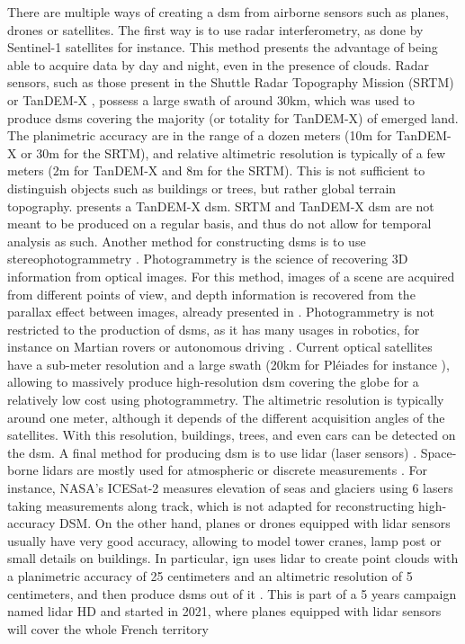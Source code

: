 There are multiple ways of creating a \acrshort{dsm} from airborne sensors such as planes, drones or satellites. The first way is to use \acrshort{radar} interferometry, as done by Sentinel-1 satellites \cite{geudtner_sentinel-1_2014} for instance. This method presents the advantage of being able to acquire data by day and night, even in the presence of clouds. Radar sensors, such as those present in the Shuttle Radar Topography Mission (SRTM) \cite{farr_shuttle_2007} or TanDEM-X \cite{krieger_tandem-x_2007}, possess a large swath of around $30$km, which was used to produce \acrshort{dsm}s covering the majority (or totality for TanDEM-X) of emerged land. The planimetric accuracy are in the range of a dozen meters (10m for TanDEM-X or 30m for the SRTM), and relative altimetric resolution is typically of a few meters (2m for TanDEM-X and 8m for the SRTM). This is not sufficient to distinguish objects such as buildings or trees, but rather global terrain topography.  presents a TanDEM-X \acrshort{dsm}. SRTM and TanDEM-X \acrshort{dsm} are not meant to be produced on a regular basis, and thus do not allow for temporal analysis as such. Another method for constructing \acrshort{dsm}s is to use stereophotogrammetry \cite{tao_comprehensive_2001}. Photogrammetry is the science of recovering 3D information from optical images. For this method, images of a scene are acquired from different points of view, and depth information is recovered from the parallax effect between images, already presented in . Photogrammetry is not restricted to the production of \acrshort{dsm}s, as it has many usages in robotics, for instance on Martian rovers \cite{goldberg_stereo_2002} or autonomous driving \cite{geiger_vision_2013}. Current optical satellites have a sub-meter resolution and a large swath (20km for Pléiades for instance \cite{coeurdevey_pleiades_2012}), allowing to massively produce high-resolution \acrshort{dsm} covering the globe for a relatively low cost using photogrammetry. The altimetric resolution is typically around one meter, although it depends of the different acquisition angles of the satellites. With this resolution, buildings, trees, and even cars can be detected on the \acrshort{dsm}. A final method for producing \acrshort{dsm} is to use \acrshort{lidar} (laser sensors) \cite{khosravipour_generating_2016}. Space-borne \acrshort{lidar}s are mostly used for atmospheric or discrete measurements \cite{fouladinejad_history_2019}. For instance, NASA’s ICESat-2 \cite{jasinski_atlasicesat-2_2020} measures elevation of seas and glaciers using 6 lasers taking measurements along track, which is not adapted for reconstructing high-accuracy DSM. On the other hand, planes or drones equipped with \acrshort{lidar} sensors usually have very good accuracy, allowing to model tower cranes, lamp post or small details on buildings. In particular, \acrshort{ign} uses \acrshort{lidar} to create point clouds with a planimetric accuracy of 25 centimeters and an altimetric resolution of 5 centimeters, and then produce \acrshort{dsm}s out of it  \cite{monnet_lidarhd_2023, ign_lidar_2024}. This is part of a 5 years campaign named \acrshort{lidar} HD and started in 2021, where planes equipped with \acrshort{lidar} sensors will cover the whole French territory 